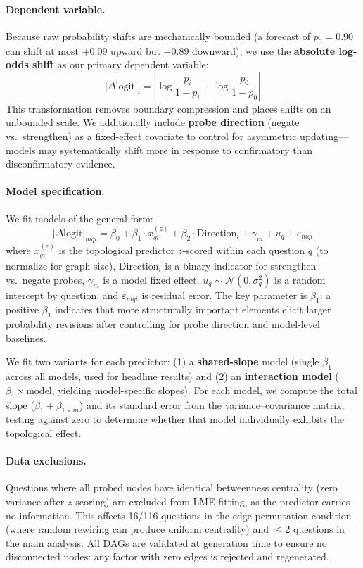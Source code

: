 \documentclass[11pt]{article}
\begin{document}
\paragraph{Dependent variable.}
Because raw probability shifts are mechanically bounded (a forecast of $p_0 = 0.90$ can shift at most $+0.09$ upward but $-0.89$ downward), we use the \textbf{absolute log-odds shift} as our primary dependent variable:
\begin{equation}
    |\Delta\text{logit}|_i = \left| \log\frac{p_i}{1-p_i} - \log\frac{p_0}{1-p_0} \right|
\end{equation}
This transformation removes boundary compression and places shifts on an unbounded scale. We additionally include \textbf{probe direction} (negate vs.\ strengthen) as a fixed-effect covariate to control for asymmetric updating---models may systematically shift more in response to confirmatory than disconfirmatory evidence.

\paragraph{Model specification.}
We fit models of the general form:
\begin{equation}
    |\Delta\text{logit}|_{mqi} = \beta_0 + \beta_1 \cdot x_{qi}^{(z)} + \beta_2 \cdot \text{Direction}_i + \gamma_m + u_q + \varepsilon_{mqi}
\end{equation}
where $x_{qi}^{(z)}$ is the topological predictor $z$-scored within each question $q$ (to normalize for graph size), $\text{Direction}_i$ is a binary indicator for strengthen vs.\ negate probes, $\gamma_m$ is a model fixed effect, $u_q \sim \mathcal{N}(0, \sigma_q^2)$ is a random intercept by question, and $\varepsilon_{mqi}$ is residual error. The key parameter is $\beta_1$: a positive $\beta_1$ indicates that more structurally important elements elicit larger probability revisions after controlling for probe direction and model-level baselines.

We fit two variants for each predictor: (1) a \textbf{shared-slope} model (single $\beta_1$ across all models, used for headline results) and (2) an \textbf{interaction model} ($\beta_1 \times \text{model}$, yielding model-specific slopes). For each model, we compute the total slope ($\beta_1 + \beta_{1 \times m}$) and its standard error from the variance--covariance matrix, testing against zero to determine whether that model individually exhibits the topological effect.

\paragraph{Data exclusions.}
Questions where all probed nodes have identical betweenness centrality (zero variance after $z$-scoring) are excluded from LME fitting, as the predictor carries no information. This affects 16/116 questions in the edge permutation condition (where random rewiring can produce uniform centrality) and $\leq$2 questions in the main analysis. All DAGs are validated at generation time to ensure no disconnected nodes: any factor with zero edges is rejected and regenerated.
\end{document}
